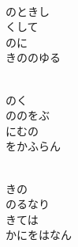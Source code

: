 \documentclass[10pt,b5j]{tarticle} %
\begin{document}
\begin{enumerate}
\begin{minipage}[c]{\blocksize}
        \vspace{\linespace}
        \item~\\
        のときし\\
        くして\\
        のに\\
        きののゆる
        
    \end{minipage}
    \begin{minipage}[c]{\blocksize}
        
        \vspace{\linespace}
        \item~\\
        のく\\
        ののをぶ\\
        にむの\\
        をかふらん
        
    \end{minipage}
    \begin{minipage}[c]{\blocksize}
        
        \vspace{\linespace}
        \item~\\
        きの\\
        のるなり\\
        きては\\
        かにをはなん
    
    \end{minipage}
\end{enumerate} %
\end{document}
